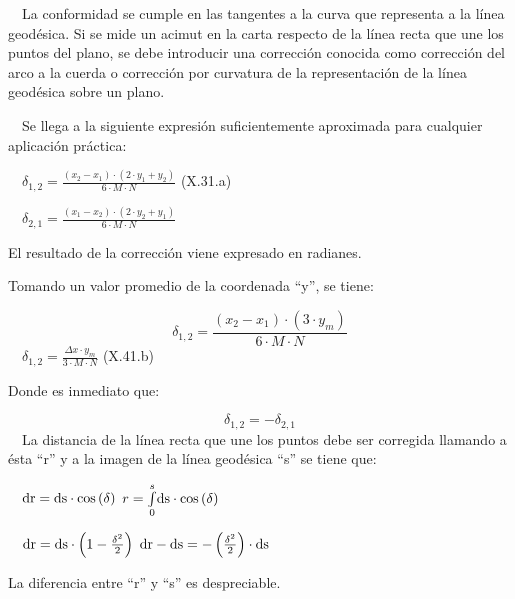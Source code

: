 \documentclass{tufte-book}
\newcommand\normalsubformula[1]{\text{\mathversion{normal}$#1$}}
\begin{document}
\ \ La conformidad se cumple en las tangentes a la curva que representa
a la línea geodésica. Si se mide un acimut en la carta respecto de
la línea recta que une los puntos del plano, se debe introducir una
corrección conocida como corrección del arco a la cuerda o
corrección por curvatura de la representación de la línea
geodésica sobre un plano.

\ \ Se llega a la siguiente expresión suficientemente aproximada para
cualquier aplicación práctica:

\ \  ${\delta _{{1,2}}=\frac{\left(x_{{2}}-x_{{1}}\right)\cdot
\left(2\cdot y_{{1}}+y_{{2}}\right)}{6\cdot M\cdot N}}$  (X.31.a)

\ \  ${\delta _{{2,1}}=\frac{\left(x_{{1}}-x_{{2}}\right)\cdot
\left(2\cdot y_{{2}}+y_{{1}}\right)}{6\cdot M\cdot N}}$

El resultado de la corrección viene expresado en radianes.

Tomando un valor promedio de la coordenada
{\textquotedblleft}y{\textquotedblright}, se tiene:

\begin{equation*}
{\delta _{{1,2}}=\frac{\left(x_{{2}}-x_{{1}}\right)\cdot \left(3\cdot
y_{{m}}\right)}{6\cdot M\cdot N}}
\end{equation*}
\ \  ${\delta _{{1,2}}=\frac{\mathit{\Delta x}\cdot y_{{m}}}{3\cdot
M\cdot N}}$  (X.41.b)

Donde es inmediato que:

\begin{equation*}
{\delta _{{1,2}}=-\delta _{{2,1}}}
\end{equation*}
\ \ La distancia de la línea recta que une los puntos debe ser
corregida llamando a ésta {\textquotedblleft}r{\textquotedblright} y
a la imagen de la línea geodésica
{\textquotedblleft}s{\textquotedblright} se tiene que:

\ \  ${\normalsubformula{\text{dr}}=\normalsubformula{\text{ds}}\cdot
\text{cos}\left(\delta \right)}$  
${r=\overset{{s}}{\underset{{0}}{\int
}}{\normalsubformula{\text{ds}}\cdot \text{cos}\left(\delta \right)}}$

\ \  ${\normalsubformula{\text{dr}}=\normalsubformula{\text{ds}}\cdot
\left(1-\frac{\delta ^{{2}}}{2}\right)}$  
${\normalsubformula{\text{dr}}-\normalsubformula{\text{ds}}=-\left(\frac{\delta
^{{2}}}{2}\right)\cdot \normalsubformula{\text{ds}}}$

La diferencia entre {\textquotedblleft}r{\textquotedblright} y
{\textquotedblleft}s{\textquotedblright} es despreciable.
\end{document}
